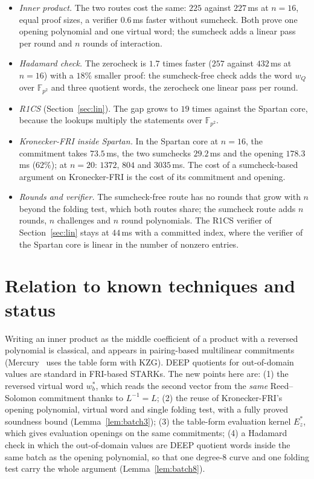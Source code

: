 \documentclass[11pt]{article}
\theoremstyle{definition}
\newcommand{\F}{\mathbb{F}}
\begin{document}
\begin{itemize}[nosep]
\item \emph{Inner product.} The two routes cost the same: $225$ against $227$\,ms at $n=16$, equal proof sizes, a verifier $0.6$\,ms faster without sumcheck. Both prove one opening polynomial and one virtual word; the sumcheck adds a linear pass per round and $n$ rounds of interaction.
\item \emph{Hadamard check.} The zerocheck is $1.7$ times faster ($257$ against $432$\,ms at $n=16$) with a $18\%$ smaller proof: the sumcheck-free check adds the word $w_Q$ over $\F_{p^2}$ and three quotient words, the zerocheck one linear pass per round.
\item \emph{R1CS} (Section~\ref{sec:lin}). The gap grows to $19$ times against the Spartan core, because the lookups multiply the statements over $\F_{p^2}$.
\item \emph{Kronecker-FRI inside Spartan.} In the Spartan core at $n=16$, the commitment takes $73.5$\,ms, the two sumchecks $29.2$\,ms and the opening $178.3$\,ms ($62\%$); at $n=20$: $1372$, $804$ and $3035$\,ms. The cost of a sumcheck-based argument on Kronecker-FRI is the cost of its commitment and opening.
\item \emph{Rounds and verifier.} The sumcheck-free route has no rounds that grow with $n$ beyond the folding test, which both routes share; the sumcheck route adds $n$ rounds, $n$ challenges and $n$ round polynomials. The R1CS verifier of Section~\ref{sec:lin} stays at $44$\,ms with a committed index, where the verifier of the Spartan core is linear in the number of nonzero entries.
\end{itemize}

\section{Relation to known techniques and status}\label{sec:status}

Writing an inner product as the middle coefficient of a product with a reversed polynomial is classical, and appears in pairing-based multilinear commitments (Mercury~\cite{EG25} uses the table form with KZG).
DEEP quotients for out-of-domain values are standard in FRI-based STARKs.
The new points here are: (1) the reversed virtual word $w_b^\ast$, which reads the second vector from the \emph{same} Reed--Solomon commitment thanks to $L^{-1}=L$; (2) the reuse of Kronecker-FRI's opening polynomial, virtual word and single folding test, with a fully proved soundness bound (Lemma~\ref{lem:batch3}); (3) the table-form evaluation kernel $E^\ast_z$, which gives evaluation openings on the same commitments; (4) a Hadamard check in which the out-of-domain values are DEEP quotient words inside the same batch as the opening polynomial, so that one degree-$8$ curve and one folding test carry the whole argument (Lemma~\ref{lem:batch8}).
\end{document}

